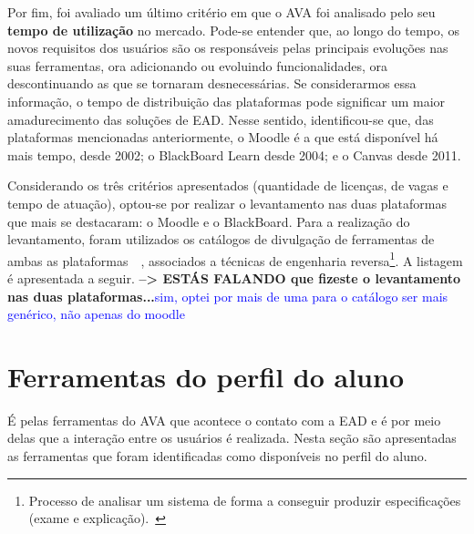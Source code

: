 
Por fim, foi avaliado um último critério em que o AVA foi analisado pelo seu \textbf{tempo de utilização} no mercado. Pode-se entender que, ao longo do tempo, os novos requisitos dos usuários são os responsáveis pelas principais evoluções nas suas ferramentas, ora adicionando ou evoluindo funcionalidades, ora descontinuando as que se tornaram desnecessárias. Se considerarmos essa informação, o tempo de distribuição das plataformas pode significar um maior amadurecimento das soluções de EAD. Nesse sentido, identificou-se que, das plataformas mencionadas anteriormente, o Moodle é a que está disponível há mais tempo, desde 2002; o BlackBoard Learn desde 2004; e o Canvas desde 2011.

Considerando os três critérios apresentados (quantidade de licenças, de vagas e tempo de atuação), optou-se por realizar o levantamento nas duas plataformas que mais se destacaram: o Moodle e o BlackBoard. Para a realização do levantamento, foram utilizados os catálogos de divulgação de ferramentas de ambas as plataformas~\cite{moodle}~\cite{bblearn}, associados a técnicas de engenharia reversa\footnote{Processo de analisar um sistema de forma a conseguir produzir especificações (exame e explicação).~\cite{chikofsky1990reverse}}. A listagem é apresentada a seguir.
\textbf{--> ESTÁS FALANDO que fizeste o levantamento nas duas plataformas...}\textcolor{blue} {sim, optei por mais de uma para o catálogo ser mais genérico, não apenas do moodle}



\section{Ferramentas do perfil do aluno}%
\label{sec:aprend}
É pelas ferramentas do AVA que acontece o contato com a EAD e é por meio delas que a interação entre os usuários é realizada. Nesta seção são apresentadas as ferramentas que foram identificadas como disponíveis no perfil do aluno.

